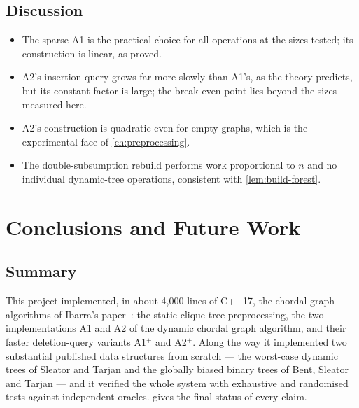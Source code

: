 \documentclass[11pt,a4paper,oneside]{report}
\theoremstyle{plain}
\theoremstyle{definition}
\theoremstyle{remark}
\begin{document}
\section{Discussion}
\begin{itemize}
\item The sparse A1 is the practical choice for all operations at the sizes tested; its
  construction is linear, as proved.
\item A2's insertion query grows far more slowly than A1's, as the theory predicts, but its
  constant factor is large; the break-even point lies beyond the sizes measured here.
\item A2's construction is quadratic even for empty graphs, which is the experimental face of
  \cref{ch:preprocessing}.
\item The double-subsumption rebuild performs work proportional to \(n\) and no individual
  dynamic-tree operations, consistent with \cref{lem:build-forest}.
\end{itemize}
\chapter{Conclusions and Future Work}\label{ch:conclusion}
\section{Summary}
This project implemented, in about 4{,}000 lines of C++17, the chordal-graph algorithms of
Ibarra's paper~\cite{ibarra2008}: the static clique-tree preprocessing, the two implementations
A1 and A2 of the dynamic chordal graph algorithm, and their faster deletion-query variants
A1\(^+\) and A2\(^+\). Along the way it implemented two substantial published data structures from scratch
--- the worst-case dynamic trees of Sleator and Tarjan and the globally biased binary trees of
Bent, Sleator and Tarjan --- and it verified the whole system with exhaustive and randomised
tests against independent oracles.  gives the final status of every
claim.
\end{document}
